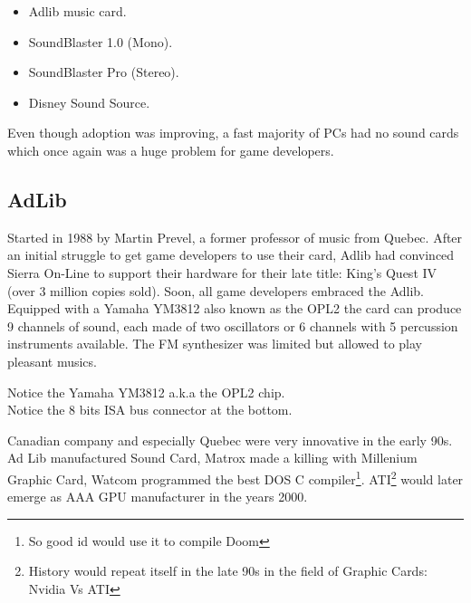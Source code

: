 \documentclass[book.tex]{subfiles}
\begin{document}
\par
\begin{itemize}
\item Adlib music card.
\item SoundBlaster 1.0 (Mono).
\item SoundBlaster Pro (Stereo).
\item Disney Sound Source.
\end{itemize}
\par
Even though adoption was improving, a fast majority of PCs had no sound cards which once again was a huge problem for game developers.


  \subsection{AdLib}
  Started in 1988 by Martin Prevel, a former professor of music from Quebec. After an initial struggle to get game developers to use their card, Adlib had convinced Sierra On-Line to support their hardware for their late title: King's Quest IV (over 3 million copies sold). Soon, all game developers embraced the Adlib. Equipped with a Yamaha YM3812 also known as the OPL2 the card can produce 9 channels of sound, each made of two oscillators or 6 channels with 5 percussion instruments available. The FM synthesizer was limited but allowed to play pleasant musics.\\
  \begin{figure}[H] 
    \centering 
  \end{figure}
    Notice the Yamaha YM3812 a.k.a the OPL2 chip.\\
    Notice the 8 bits ISA bus connector at the bottom.
\par
{} Canadian company and especially Quebec were very innovative in the early 90s. Ad Lib manufactured Sound Card, Matrox made a killing with Millenium Graphic Card, Watcom programmed the best DOS C compiler\footnote{So good id would use it to compile Doom}. ATI\footnote{History would repeat itself in the late 90s in the field of Graphic Cards: Nvidia Vs ATI} would later emerge as AAA GPU manufacturer in the years 2000.\\
  
  
\end{document}
